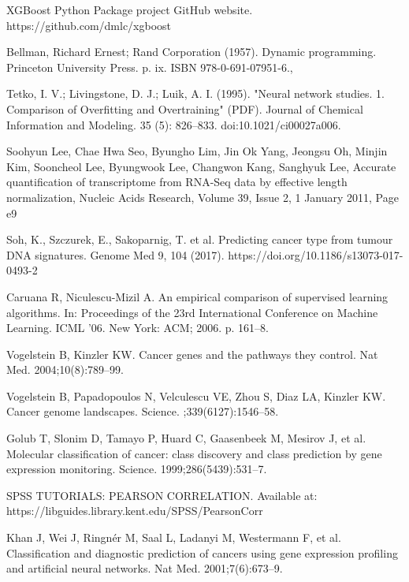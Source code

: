 \documentclass[12pt,a4paper]{report}
\begin{document}
\begin{thebibliography}{HHM99}
XGBoost Python Package project GitHub website. https://github.com/dmlc/xgboost

Bellman, Richard Ernest; Rand Corporation (1957). Dynamic programming. Princeton University Press. p. ix. ISBN 978-0-691-07951-6.,


Tetko, I. V.; Livingstone, D. J.; Luik, A. I. (1995). "Neural network studies. 1. Comparison of Overfitting and Overtraining" (PDF). Journal of Chemical Information and Modeling. 35 (5): 826–833. doi:10.1021/ci00027a006.


Soohyun Lee, Chae Hwa Seo, Byungho Lim, Jin Ok Yang, Jeongsu Oh, Minjin Kim, Sooncheol Lee, Byungwook Lee, Changwon Kang, Sanghyuk Lee, Accurate quantification of transcriptome from RNA-Seq data by effective length normalization, Nucleic Acids Research, Volume 39, Issue 2, 1 January 2011, Page e9

 
 
Soh, K., Szczurek, E., Sakoparnig, T. et al.
\newblock Predicting cancer type from tumour DNA signatures. Genome Med 9, 104 (2017).
\newblock  https://doi.org/10.1186/s13073-017-0493-2 

 
Caruana R, Niculescu-Mizil A.
\newblock An empirical comparison of supervised learning algorithms. In: Proceedings of the 23rd International Conference on Machine Learning. 
\newblock ICML ’06. New York: ACM; 2006. p. 161–8.

\newblock 
Vogelstein B, Kinzler KW. Cancer genes and the pathways they control. 
\newblock Nat Med. 2004;10(8):789–99.


Vogelstein B, Papadopoulos N, Velculescu VE, Zhou S, Diaz LA, Kinzler KW. 
\newblock Cancer genome landscapes. Science.
;339(6127):1546–58.


Golub T, Slonim D, Tamayo P, Huard C, Gaasenbeek M, Mesirov J, et al.
\newblock  Molecular classification of cancer: class discovery and class prediction by gene expression monitoring.
\newblock  Science. 1999;286(5439):531–7.

SPSS TUTORIALS: PEARSON CORRELATION. Available at: https://libguides.library.kent.edu/SPSS/PearsonCorr


Khan J, Wei J, Ringnér M, Saal L, Ladanyi M, Westermann F, et al. Classification and diagnostic prediction of cancers using gene expression profiling and artificial neural networks. Nat Med. 2001;7(6):673–9.




\end{thebibliography}
\end{document}
